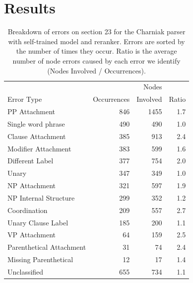 \section{Results}

\begin{table}
\begin{center}
\begin{tabular}{|lrrr|}
	\hline
		                        &             & Nodes    &       \\
		Error Type\hspace{-8mm} & Occurrences & Involved & Ratio \\
	\hline
	\hline
		PP Attachment\hspace{-8mm} & 846 & 1455 & 1.7 \\
		Single word phrase\hspace{-8mm} & 490 & 490 & 1.0 \\
		Clause Attachment\hspace{-8mm} & 385 & 913 & 2.4 \\
		Modifier Attachment\hspace{-8mm} & 383 & 599 & 1.6 \\
		Different Label\hspace{-8mm} & 377 & 754 & 2.0 \\
		Unary & 347 & 349 & 1.0 \\
		NP Attachment\hspace{-8mm} & 321 & 597 & 1.9 \\
		NP Internal Structure\hspace{-8mm} & 299 & 352 & 1.2 \\
		Coordination & 209 & 557 & 2.7 \\
		Unary Clause Label\hspace{-8mm} & 185 & 200 & 1.1 \\
		VP Attachment & 64 & 159 & 2.5 \\
		Parenthetical Attachment\hspace{-8mm} & 31 & 74 & 2.4 \\
		Missing Parenthetical\hspace{-8mm} & 12 & 17 & 1.4 \\
		Unclassified & 655 & 734 & 1.1 \\
	\hline
\end{tabular}
\caption{\label{tab:charniak-breakdown}
	Breakdown of errors on section 23 for the Charniak parser with self-trained
	model and reranker.  Errors are sorted by the number of times they occur.
	Ratio is the average number of node errors caused by each error we identify
	(\myie Nodes Involved / Occurrences).
}
\end{center}
\end{table}

